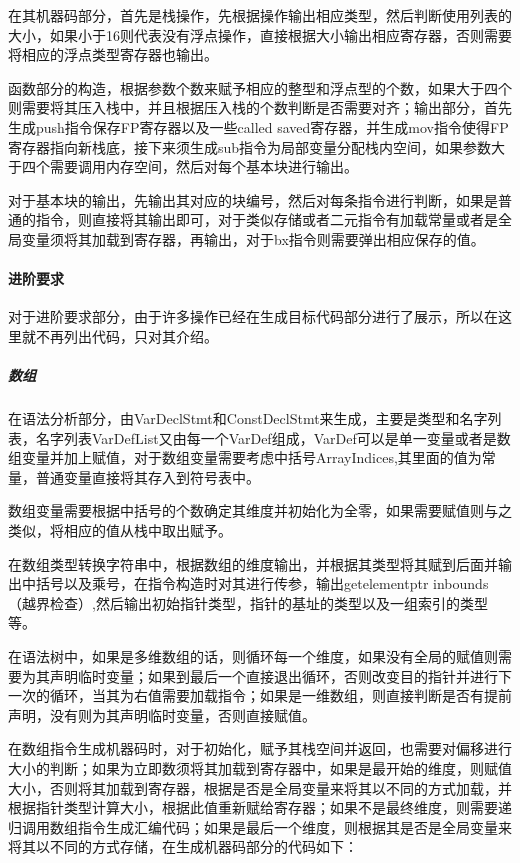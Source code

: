 \documentclass[UTF8,a4paper,10pt]{ctexart}
\begin{document}
在其机器码部分，首先是栈操作，先根据操作输出相应类型，然后判断使用列表的大小，如果小于16则代表没有浮点操作，直接根据大小输出相应寄存器，否则需要将相应的浮点类型寄存器也输出。

函数部分的构造，根据参数个数来赋予相应的整型和浮点型的个数，如果大于四个则需要将其压入栈中，并且根据压入栈的个数判断是否需要对齐；输出部分，首先生成push指令保存FP寄存器以及一些called saved寄存器，并生成mov指令使得FP寄存器指向新栈底，接下来须生成sub指令为局部变量分配栈内空间，如果参数大于四个需要调用内存空间，然后对每个基本块进行输出。

对于基本块的输出，先输出其对应的块编号，然后对每条指令进行判断，如果是普通的指令，则直接将其输出即可，对于类似存储或者二元指令有加载常量或者是全局变量须将其加载到寄存器，再输出，对于bx指令则需要弹出相应保存的值。

\paragraph{进阶要求}
对于进阶要求部分，由于许多操作已经在生成目标代码部分进行了展示，所以在这里就不再列出代码，只对其介绍。
\subparagraph{数组}
在语法分析部分，由VarDeclStmt和ConstDeclStmt来生成，主要是类型和名字列表，名字列表VarDefList又由每一个VarDef组成，VarDef可以是单一变量或者是数组变量并加上赋值，对于数组变量需要考虑中括号ArrayIndices,其里面的值为常量，普通变量直接将其存入到符号表中。

数组变量需要根据中括号的个数确定其维度并初始化为全零，如果需要赋值则与之类似，将相应的值从栈中取出赋予。

在数组类型转换字符串中，根据数组的维度输出，并根据其类型将其赋到后面并输出中括号以及乘号，在指令构造时对其进行传参，输出getelementptr inbounds（越界检查）,然后输出初始指针类型，指针的基址的类型以及一组索引的类型等。

在语法树中，如果是多维数组的话，则循环每一个维度，如果没有全局的赋值则需要为其声明临时变量；如果到最后一个直接退出循环，否则改变目的指针并进行下一次的循环，当其为右值需要加载指令；如果是一维数组，则直接判断是否有提前声明，没有则为其声明临时变量，否则直接赋值。

在数组指令生成机器码时，对于初始化，赋予其栈空间并返回，也需要对偏移进行大小的判断；如果为立即数须将其加载到寄存器中，如果是最开始的维度，则赋值大小，否则将其加载到寄存器，根据是否是全局变量来将其以不同的方式加载，并根据指针类型计算大小，根据此值重新赋给寄存器；如果不是最终维度，则需要递归调用数组指令生成汇编代码；如果是最后一个维度，则根据其是否是全局变量来将其以不同的方式存储，在生成机器码部分的代码如下：
\end{document}
